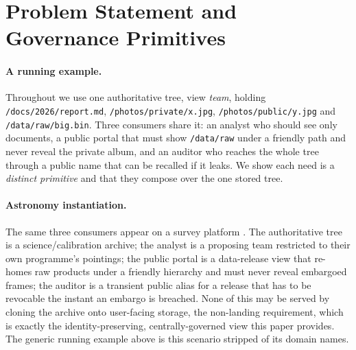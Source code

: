 \documentclass[numberedsection,acmtos]{acmart}
\begin{document}
\section{Problem Statement and Governance Primitives}
\label{sec:problem}

\paragraph{A running example.}
Throughout we use one authoritative tree, view \emph{team}, holding
\texttt{/docs/2026/report.md}, \texttt{/photos/private/x.jpg},
\texttt{/photos/public/y.jpg} and \texttt{/data/raw/big.bin}. Three consumers
share it: an analyst who should see only documents, a public portal that must
show \texttt{/data/raw} under a friendly path and never reveal the private
album, and an auditor who reaches the whole tree through a public name that can
be recalled if it leaks. We show each need is a \emph{distinct primitive} and
that they compose over the one stored tree.

\paragraph{Astronomy instantiation.}
The same three consumers appear on a survey platform \citep{han2026yourfs}.
The authoritative tree is a science/calibration archive; the analyst is a
proposing team restricted to their own programme's pointings; the public portal is
a data-release view that re-homes raw products under a friendly hierarchy and must
never reveal embargoed frames; the auditor is a transient public alias for a
release that has to be revocable the instant an embargo is breached. None of
this may be served by cloning the archive onto user-facing storage, the
non-landing requirement, which is exactly the identity-preserving,
centrally-governed view this paper provides. The generic running example above is
this scenario stripped of its domain names.
\end{document}
